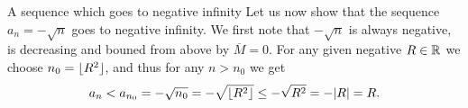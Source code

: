 \begin{example}{A sequence which goes to negative infinity}{}
	Let us now show that the sequence $a_{n}=-\sqrt{n}$ goes to negative infinity. We first note that $-\sqrt{n}$ is always negative, is decreasing and bouned from above by $\overline{M}=0$. For any given negative $R\in\mathbb{R}^{}$ we choose $n_{0}=\lfloor R^{2} \rfloor$, and thus for any $n>n_{0}$ we get
	\[
		a_{n} < a_{n_{0}} = -\sqrt{n_{0}} = -\sqrt{\lfloor R^{2} \rfloor} \leq -\sqrt{R^{2}} = -|R| = R.
	\]

\end{example}

